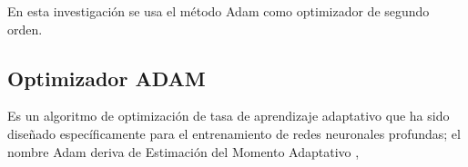 
		En esta investigación se usa el método Adam como optimizador de segundo orden.

	\subsection{Optimizador ADAM}
	
		Es un algoritmo de optimización de tasa de aprendizaje adaptativo que ha sido diseñado específicamente para el entrenamiento de redes neuronales profundas; el nombre Adam deriva de Estimación del Momento Adaptativo \citep {Adam},


